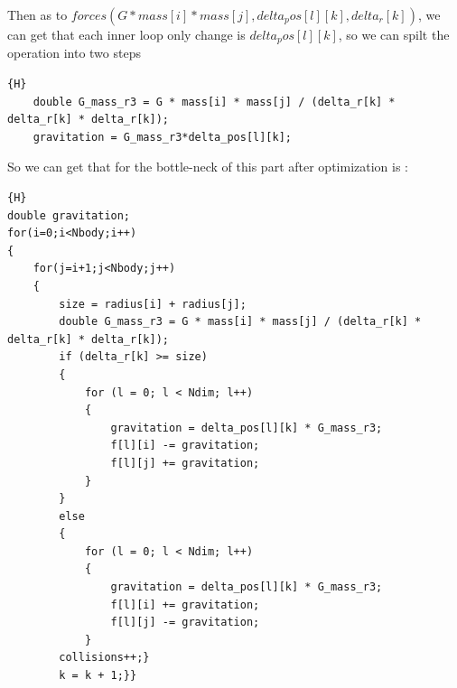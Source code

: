 \documentclass{article}
\begin{document}
Then as to $forces(G*mass[i]*mass[j],delta_pos[l][k],delta_r[k])$, we can get that each inner loop only change is $delta_pos[l][k]$, so we can spilt the operation into two steps
\begin{lstlisting}[caption={split force into two steps}]{H}
	double G_mass_r3 = G * mass[i] * mass[j] / (delta_r[k] * delta_r[k] * delta_r[k]);
	gravitation = G_mass_r3*delta_pos[l][k];
\end{lstlisting}
So we can get that for the bottle-neck of this part after optimization is :
\begin{lstlisting}[caption={split force into two steps}]{H}
double gravitation;
for(i=0;i<Nbody;i++)
{
	for(j=i+1;j<Nbody;j++)
	{
		size = radius[i] + radius[j];
		double G_mass_r3 = G * mass[i] * mass[j] / (delta_r[k] * delta_r[k] * delta_r[k]);
		if (delta_r[k] >= size)
		{
			for (l = 0; l < Ndim; l++)
			{
				gravitation = delta_pos[l][k] * G_mass_r3;
				f[l][i] -= gravitation;
				f[l][j] += gravitation;
			}
		}
		else
		{
			for (l = 0; l < Ndim; l++)
			{
				gravitation = delta_pos[l][k] * G_mass_r3;
				f[l][i] += gravitation;
				f[l][j] -= gravitation;
			}
		collisions++;}
		k = k + 1;}}
\end{lstlisting}
\end{document}
